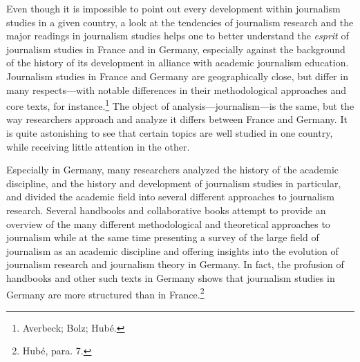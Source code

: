 \documentclass{tufte-handout}
\begin{document}
Even though it is impossible to point out every development within
journalism studies in a given country, a look at the tendencies of
journalism research and the major readings in journalism studies helps
one to better understand the \emph{esprit} of journalism studies in
France and in Germany, especially against the background of the history
of its development in alliance with academic journalism education.
Journalism studies in France and Germany are geographically close, but
differ in many respects---with notable differences in their
methodological approaches and core texts, for instance.\footnote{Averbeck;
  Bolz; Hubé.} The object of analysis---journalism---is the same, but
the way researchers approach and analyze it differs between France and
Germany. It is quite astonishing to see that certain topics are well
studied in one country, while receiving little attention in the other.

Especially in Germany, many researchers analyzed the history of the
academic discipline, and the history and development of journalism
studies in particular, and divided the academic field into several
different approaches to journalism research. Several handbooks and
collaborative books attempt to provide an overview of the many different
methodological and theoretical approaches to journalism while at the
same time presenting a survey of the large field of journalism as an
academic discipline and offering insights into the evolution of
journalism research and journalism theory in Germany. In fact, the
profusion of handbooks and other such texts in Germany shows that
journalism studies in Germany are more structured than in
France.\footnote{Hubé, para. 7.}
\end{document}
